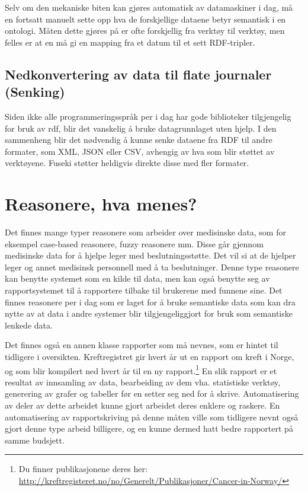 \documentclass[11pt]{article}
\begin{document}
Selv om den mekaniske biten kan gjøres automatisk av datamaskiner i dag, må en fortsatt manuelt sette opp hva de forskjellige dataene betyr semantisk i en ontologi. Måten dette gjøres på er ofte forskjellig fra verktøy til verktøy, men felles er at en må gi en mapping fra et datum til et sett RDF-tripler.

\subsection{Nedkonvertering av data til flate journaler (Senking)}
Siden ikke alle programmeringsspråk per i dag har gode biblioteker tilgjengelig for bruk av rdf, blir det vanskelig å bruke datagrunnlaget uten hjelp.
I den sammenheng blir det nødvendig å kunne senke dataene fra RDF til andre formater, som XML, JSON eller CSV, avhengig av hva som blir støttet av verktøyene. Fuseki støtter heldigvis direkte disse med fler formater.

\section{Reasonere, hva menes?}
Det finnes mange typer reasonere som arbeider over medisinske data, som for eksempel case-based reasonere\cite{hybrid-case-based}, fuzzy reasonere \cite{fuzzy-approach} \cite{fuzzycogmap} mm.
Disse går gjennom medisinske data for å hjelpe leger med beslutningsstøtte. Det vil si at de hjelper leger og annet medisinsk personnell med å ta beslutninger. Denne type reasonere kan benytte systemet som en kilde til data, men kan også benytte seg av rapportsystemet til å rapportere tilbake til brukerene med funnene sine.
Det finnes reasonere per i dag som er laget for å bruke semantiske data\cite{ application-ontological-reasoning} som kan dra nytte av at data i andre systemer blir tilgjengeliggjort for bruk som semantiske lenkede data.

Det finnes også en annen klasse rapporter som må nevnes, som er hintet til tidligere i oversikten.
Kreftregistret gir hvert år ut en rapport om kreft i Norge\cite{kreftregistret2011}, og som blir kompilert ned hvert år til en ny rapport.\footnote{Du finner publikasjonene deres her: \url{http://kreftregisteret.no/no/Generelt/Publikasjoner/Cancer-in-Norway/}}
En slik rapport er et resultat av innsamling av data, bearbeiding av dem vha. statistiske verktøy, generering av grafer og tabeller før en setter seg ned for å skrive.
Automatisering av deler av dette arbeidet kunne gjort arbeidet deres enklere og raskere.
En automatisering av rapportskriving på denne måten ville som tidligere nevnt også gjort denne type arbeid billigere, og en kunne dermed hatt bedre rapportert på samme budsjett.
\end{document}
